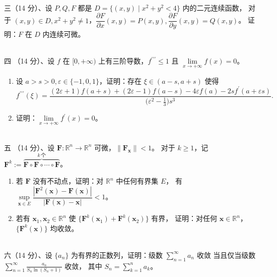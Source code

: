 ~\\
三（14 分）、设 $P, Q, F$ 都是 $D=\{(x, y) \mid x^{2}+y^{2}<4\}$ 内的二元连续函数，
对于 $(x, y) \in D, x^{2}+y^{2} \neq 1$，$\dfrac{\partial F}{\partial x}(x, y)=P(x, y), \dfrac{\partial F}{\partial y}(x, y)=Q(x, y)$。
证明：$F$ 在 $D$ 内连续可微。

~\\
四 （14 分）、设 $f$ 在 $[0,+\infty)$ 上有三阶导数，$f^{\prime \prime \prime} \leq 1$ 且 $\lim\limits_{x \rightarrow+\infty} f(x)=0$。
\begin{enumerate}[label=(\roman*)]
\item 设 $a>s>0, \varepsilon \in \{-1,0,1\}$，证明：存在 $\xi \in (a-s, a+s)$ 使得
$$f^{\prime \prime \prime}(\xi)=\frac{(2\varepsilon+1)f(a+s)+(2\varepsilon-1)f(a-s)-4\varepsilon f(a)
-2sf^{\prime}(a+\varepsilon s)}{\big(\varepsilon^{2}-\frac{1}{3}\big)s^{3}}.$$
\item 证明：$\lim\limits_{x \rightarrow+\infty} f^{\prime}(x)=0$。
\end{enumerate}

~\\
五 （14 分）、设 $\mathbf{F}: \mathbb{R}^{n} \rightarrow \mathbb{R}^{n}$ 可微，$\|\mathbf{F}_{\mathbf{x}}\|<1$。
对于 $k \geq 1$，记 $\mathbf{F}^{k}:=\overbrace{\mathbf{F} \circ \mathbf{F} \circ \cdots \circ \mathbf{F}}^{k\,个}$。
\begin{enumerate}[label=(\roman*)]
\item 若 $\mathbf{F}$ 没有不动点，证明：对 $\mathbb{R}^{n}$ 中任何有界集 $E$，
有 $\sup\limits_{\mathbf{x} \in E} \dfrac{|\mathbf{F}^{2}(\mathbf{x})-\mathbf{F}(\mathbf{x})|}{|\mathbf{F}(\mathbf{x})-\mathbf{x}|}<1$。
\item 若有 $\mathbf{x}_{1}, \mathbf{x}_{2} \in \mathbb{R}^{n}$ 使 $\{\mathbf{F}^{k}(\mathbf{x}_{1})+\mathbf{F}^{k}(\mathbf{x}_{2})\}$ 有界，
证明：对任何 $\mathbf{x} \in \mathbb{R}^{n}$，$\{\mathbf{F}^{k}(\mathbf{x})\}$ 均收敛。
\end{enumerate}

~\\
六（14 分）、设 $\{a_{n}\}$ 为有界的正数列，证明：级数 $\displaystyle\sum_{n=1}^{\infty} a_{n}$ 收敛
当且仅当级数 $\displaystyle\sum_{n=1}^{\infty} \frac{a_{n}}{S_{n} \ln (S_{n}+1)}$ 收敛，
其中 $\displaystyle S_{n}=\sum_{k=1}^{n} a_{k}$。


